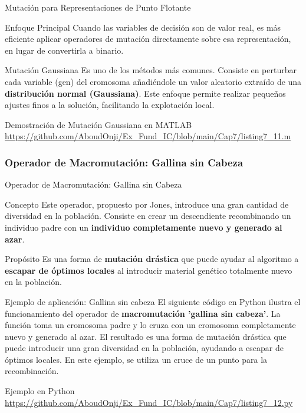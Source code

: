 \documentclass[aspectratio=169,xcolor=dvipsnames]{beamer}
\begin{document}
\begin{frame}[fragile]{Mutación para Representaciones de Punto Flotante}
    \begin{block}{Enfoque Principal}
    Cuando las variables de decisión son de valor real, es más eficiente aplicar operadores de mutación directamente sobre esa representación, en lugar de convertirla a binario.
    \end{block}
    
    \begin{alertblock}{Mutación Gaussiana}
    Es uno de los métodos más comunes. Consiste en perturbar cada variable (gen) del cromosoma añadiéndole un valor aleatorio extraído de una \textbf{distribución normal (Gaussiana)}. Este enfoque permite realizar pequeños ajustes finos a la solución, facilitando la explotación local.
    \end{alertblock}
    \begin{block}{Demostración de Mutación Gaussiana en MATLAB}
        \url{https://github.com/AboudOnji/Ex_Fund_IC/blob/main/Cap7/listing7_11.m}
    \end{block}
\end{frame}

\subsubsection{Operador de Macromutación: Gallina sin Cabeza}

\begin{frame}[fragile]{Operador de Macromutación: Gallina sin Cabeza}
    \begin{block}{Concepto}
    Este operador, propuesto por Jones, introduce una gran cantidad de diversidad en la población. Consiste en crear un descendiente recombinando un individuo padre con un \textbf{individuo completamente nuevo y generado al azar}.
    \end{block}
    
    \begin{alertblock}{Propósito}
    Es una forma de \textbf{mutación drástica} que puede ayudar al algoritmo a \textbf{escapar de óptimos locales} al introducir material genético totalmente nuevo en la población.
    \end{alertblock}

\end{frame}

\begin{frame}{Ejemplo de aplicación: Gallina sin cabeza}
El siguiente código en Python ilustra el funcionamiento del operador de \textbf{macromutación 'gallina sin cabeza'}. La función toma un cromosoma padre y lo cruza con un cromosoma completamente nuevo y generado al azar. El resultado es una forma de mutación drástica que puede introducir una gran diversidad en la población, ayudando a escapar de óptimos locales. En este ejemplo, se utiliza un cruce de un punto para la recombinación.
\begin{block}{Ejemplo en Python}
    \url{https://github.com/AboudOnji/Ex_Fund_IC/blob/main/Cap7/listing7_12.py}
\end{block}
\end{frame}
\end{document}

